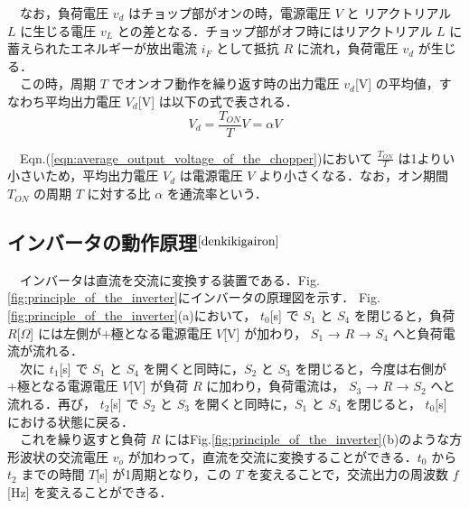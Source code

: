 　なお，負荷電圧 $v_d$ はチョップ部がオンの時，電源電圧 $V$ と リアクトリアル $L$ に生じる電圧 $v_L$ との差となる．チョップ部がオフ時にはリアクトリアル $L$ に蓄えられたエネルギーが放出電流 $i_F$ として抵抗 $R$ に流れ，負荷電圧 $v_d$ が生じる．\\
　この時，周期 $T$ でオンオフ動作を繰り返す時の出力電圧 $v_d$[V] の平均値，すなわち平均出力電圧 $V_d$[V] は以下の式で表される．
\begin{equation}
    V_d = \frac{T_{ON}}{T}V = \alpha V
    \label{eqn:average_output_voltage_of_the_chopper}
\end{equation}

　Eqn.(\ref{eqn:average_output_voltage_of_the_chopper})において $\frac{T_{ON}}{T}$ は1よりい小さいため，平均出力電圧 $V_d$ は電源電圧 $V$ より小さくなる．なお，オン期間 $T_{ON}$ の周期 $T$ に対する比 $\alpha$ を通流率という．

\subsection{インバータの動作原理$^{\cite{denkikigairon}}$}
　インバータは直流を交流に変換する装置である．Fig.\ref{fig:principle_of_the_inverter}にインバータの原理図を示す．
Fig.\ref{fig:principle_of_the_inverter}(a)において， $t_0$[s] で $S_1$ と $S_4$ を閉じると，負荷 $R$[$\Omega$] には左側が+極となる電源電圧 $V$[V] が加わり， $S_1$ → $R$ → $S_4$ へと負荷電流が流れる．\\
　次に $t_1$[s] で $S_1$ と $S_4$ を開くと同時に，$S_2$ と $S_3$ を閉じると，今度は右側が+極となる電源電圧 $V$[V] が負荷 $R$ に加わり，負荷電流は， $S_3$ → $R$ → $S_2$ へと流れる．再び， $t_2$[s] で $S_2$ と $S_3$ を開くと同時に，$S_1$ と $S_4$ を閉じると， $t_0$[s] における状態に戻る．\\
　これを繰り返すと負荷 $R$ にはFig.\ref{fig:principle_of_the_inverter}(b)のような方形波状の交流電圧 $v_o$ が加わって，直流を交流に変換することができる．$t_0$ から $t_2$ までの時間 $T$[s] が1周期となり，この $T$ を変えることで，交流出力の周波数 $f$[Hz] を変えることができる．

